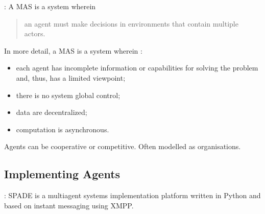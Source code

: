 \begin{frame}{\insertsection: \insertsubsection}
    \onslide<+->
    A \ac{MAS} is a system wherein \blockquote[\cite{russell2022ArtificialIntelligenceModern}]{\textelp{} an agent must make decisions in environments that contain multiple actors.}

    \onslide<+->
    \bigskip
    In more detail, a \ac{MAS} is a system wherein \cite{dignum2013MultiagentOrganizations}:
    \begin{itemize}
        \item each agent has incomplete information or capabilities for solving the problem and, thus, has a \alert{limited viewpoint}; 
        \item there is no system global \alert{control}; 
        \item data are \alert{decentralized};
        \item computation is \alert{asynchronous}.
    \end{itemize}

    \onslide<+->
    \bigskip

    Agents can be cooperative or competitive. Often modelled as organisations.
\end{frame}



\subsection{Implementing Agents}

\begin{frame}{\insertsection: \insertsubsection}
    \Ac{SPADE} is a multiagent systems implementation platform written in Python and based on instant messaging using \ac{XMPP}.
\end{frame}